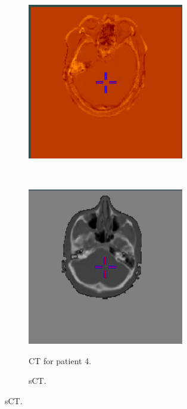 \begin{figure}
\begin{subfigure}[b]{0.3\textwidth}
        \includegraphics[width=0.75\textwidth]{colager/loocv_ct/loocv_010850_sub.png}
        \label{col:loocv_ct_pat3_sub}
    \end{subfigure}\\
    \begin{subfigure}[b]{0.3\textwidth}
        \caption{CT for patient 4.}
        \includegraphics[width=0.75\textwidth]{colager/loocv_ct/loocv_010960_ct.png}
        \label{col:loocv_ct_pat4_ct}
    \end{subfigure}\hfill
    \begin{subfigure}[b]{0.3\textwidth}
        \caption{sCT.}

\end{subfigure}
\end{figure}
